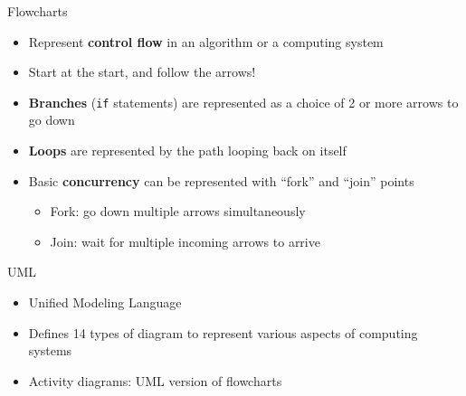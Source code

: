 \begin{frame}{Flowcharts}
	\begin{itemize}
		\pause\item Represent \textbf{control flow} in an algorithm or a computing system
		\pause\item Start at the start, and follow the arrows!
		\pause\item \textbf{Branches} (\texttt{if} statements) are represented as a choice of 2 or more arrows to go down
		\pause\item \textbf{Loops} are represented by the path looping back on itself
		\pause\item Basic \textbf{concurrency} can be represented with ``fork'' and ``join'' points
		\begin{itemize}
			\item Fork: go down multiple arrows simultaneously
			\item Join: wait for multiple incoming arrows to arrive
		\end{itemize}
	\end{itemize}
\end{frame}

\begin{frame}{UML}
	\begin{itemize}
		\pause\item Unified Modeling Language
		\pause\item Defines 14 types of diagram to represent various aspects of computing systems
		\pause\item Activity diagrams: UML version of flowcharts
	\end{itemize}
\end{frame}

